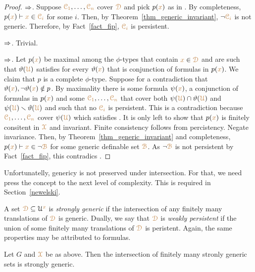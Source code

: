\begin{proof}
  $\Rightarrow$.
  Suppose ${\color{brown}\EuScript C_1},\dots,{\color{brown}\EuScript C_n}$ cover ${\color{brown}\EuScript D}$ and pick $p({\color{brown} x})$ as in .
  By completeness, $p({\color{brown} x})\vdash {\color{brown}x}\in{\color{brown}\EuScript C_i}$ for some $i$.
  Then, by Theorem~\ref{thm_generic_invariant}, $\neg{\color{brown}\EuScript C_i}$ is not generic.
  Therefore, by Fact~\ref{fact_fip}, ${\color{brown}\EuScript C_i}$ is persistent.
  
  $\Rightarrow$.
  Trivial.

  $\Rightarrow$.
  Let $p({\color{brown} x})$ be maximal among the $\phi$-types that contain ${\color{brown} x}\in{\color{brown}\EuScript D}$ and are such that $\vartheta({\color{brown}\EuScript U})$ satisfies  for every $\vartheta({\color{brown} x})$ that is conjunction of formulas in $p({\color{brown} x})$.
  We claim that $p$ is a complete $\phi$-type.
  Suppose for a contradiction that $\vartheta({\color{brown} x}),\neg\vartheta({\color{brown} x})\notin p$.
  By maximality there is some formula $\psi({\color{brown} x})$, a conjunction of formulas in $p({\color{brown} x})$ and some ${\color{brown}\EuScript C_1},\dots,{\color{brown}\EuScript C_n}$ that cover both $\psi({\color{brown}\EuScript U})\cap\vartheta({\color{brown}\EuScript U})$ and $\psi({\color{brown}\EuScript U})\smallsetminus\vartheta({\color{brown}\EuScript U})$ and such that no ${\color{brown}\EuScript C_i}$ is persistent.
  This is a contradiction because ${\color{brown}\EuScript C_1},\dots,{\color{brown}\EuScript C_n}$ cover $\psi({\color{brown}\EuScript U})$ which satisfies .
  It is only left to show that $p({\color{brown} x})$ is finitely consitent in ${\color{brown}\EuScript X}$ and invariant.
  Finite consistency follows from percistency.
  Negate invariance.
  Then, by Theorem~\ref{thm_generic_invariant} and completeness, $p({\color{brown} x})\vdash {\color{brown}x}\in\neg{\color{brown}\EuScript B}$ for some generic definable set ${\color{brown}\EuScript B}$.
  As $\neg{\color{brown}\EuScript B}$ is not persistent by Fact~\ref{fact_fip}, this contradics .
\end{proof}

Unfortunatelly, genericy is not preserved under intersection.
For that, we need press the concept to the next level of complexity.
This is required in Section~\ref{newelski}.

A set ${\color{brown}\EuScript D}\subseteq\EuScript U^{\color{brown} x}$ is \emph{strongly generic\/} if the intersection of any finitely many translations of ${\color{brown}\EuScript D}$ is generic.
Dually, we say that ${\color{brown}\EuScript D}$ is \emph{weakly persistent\/} if the union of some finitely many translations of ${\color{brown}\EuScript D}$ is peristent.
Again, the same properties may be attributed to formulas.

\begin{lemma}\label{lem_strongly_generic}
  Let $G$ and ${\color{brown}\EuScript X}$ be as above.
  Then the intersection of finitely many stronly generic sets is strongly generic.
\end{lemma}

